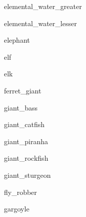\documentclass[letterpaper,serif]{module}
\begin{document}
\begin{newmonster}{elemental_water_greater}\end{newmonster}

\begin{newmonster}{elemental_water_lesser}\end{newmonster}

\begin{newmonster}{elephant}\end{newmonster}

\begin{newmonster}{elf}\end{newmonster}

\begin{newmonster}{elk}\end{newmonster}

\begin{newmonster}{ferret_giant}\end{newmonster}

\begin{newmonster}{giant_bass}\end{newmonster}

\begin{newmonster}{giant_catfish}\end{newmonster}

\begin{newmonster}{giant_piranha}\end{newmonster}

\begin{newmonster}{giant_rockfish}\end{newmonster}

\begin{newmonster}{giant_sturgeon}\end{newmonster}

\begin{newmonster}{fly_robber}\end{newmonster}

\begin{newmonster}{gargoyle}\end{newmonster}
\end{document}
